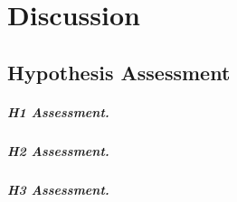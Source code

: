 
\chapter{Discussion}
\label{chap:discussion}


\lipsum[39]

\section{Hypothesis Assessment}
\label{sec:hyp-assessment}


\paragraph{H1 Assessment.}
\lipsum[40]

\paragraph{H2 Assessment.}
\lipsum[41]

\paragraph{H3 Assessment.}
\lipsum[42]

\begin{criticalinsight}
\end{criticalinsight}

